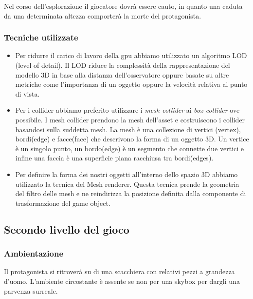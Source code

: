 \documentclass[12pt]{report}
\begin{document}
Nel corso dell'esplorazione il giocatore dovr\`a essere cauto, in quanto una caduta da una determinata altezza comporter\`a la morte del protagonista.

\subsubsection*{Tecniche utilizzate}
\begin{itemize}
    \item Per ridurre il carico di lavoro della gpu abbiamo utilizzato un algoritmo LOD (level of detail). Il LOD riduce la complessità della rappresentazione del modello 3D in base alla distanza dell'osservatore oppure basate su altre metriche come l'importanza di un oggetto oppure la velocit\`a relativa al punto di vista.
    \item Per i collider abbiamo preferito utilizzare i \textit{mesh collider} ai \textit{box collider} ove possibile. I mesh collider prendono la mesh dell'asset e costruiscono i collider basandosi sulla suddetta mesh. 
    La mesh è una collezione di vertici (vertex), bordi(edge) e facce(face) che descrivono la forma di un oggetto 3D. Un vertice \`e un singolo punto, un bordo(edge) \`e un segmento che connette due vertici e infine una faccia è una superficie piana racchiusa tra bordi(edges).
    \item Per definire la forma dei nostri oggetti all'interno dello spazio 3D abbiamo utilizzato la tecnica del Mesh renderer. Questa tecnica prende la geometria del filtro delle mesh e ne reindirizza la posizione definita dalla componente di trasformazione del game object.
\end{itemize}

\subsection{Secondo livello del gioco}
\subsubsection*{Ambientazione}
Il protagonista si ritrover\`a su di una scacchiera con relativi pezzi a grandezza d'uomo. L'ambiente circostante è assente se non per una skybox per dargli una parvenza surreale.
\end{document}
